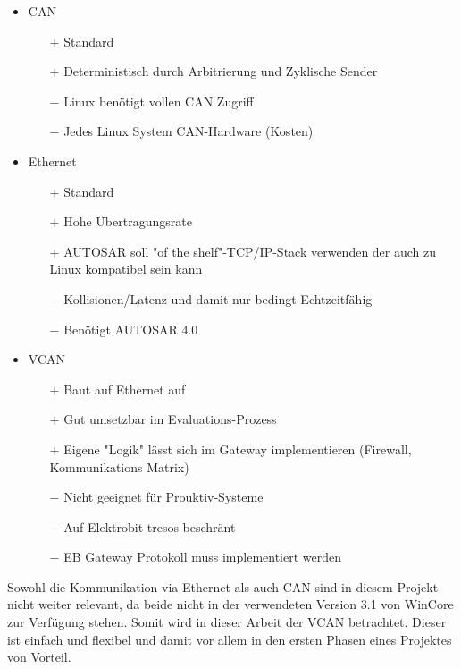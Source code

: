 \documentclass[
  a4paper,					    %
  twoside,
  DIV=calc,     				%
  bibliography=totoc,
  cleardoublepage=empty,
  ngerman,     					%
  final       					%
]{scrbook}
\begin{document}
\begin{itemize}
    \item CAN
    \begin{itemize}
        \item[$+$] Standard
        \item[$+$] Deterministisch durch Arbitrierung und Zyklische Sender
        \item[$-$] Linux benötigt vollen CAN Zugriff
        \item[$-$] Jedes Linux System CAN-Hardware (Kosten)
    \end{itemize}
    \item Ethernet
    \begin{itemize}
        \item[$+$] Standard
        \item[$+$] Hohe Übertragungsrate
        \item[$+$] AUTOSAR soll "of the shelf"-TCP/IP-Stack verwenden der auch zu Linux kompatibel sein kann\cite[S. 21]{autosar_eth}
        \item[$-$] Kollisionen/Latenz und damit nur bedingt Echtzeitfähig
        \item[$-$] Benötigt AUTOSAR 4.0
    \end{itemize}
    \item VCAN
    \begin{itemize}
        \item[$+$] Baut auf Ethernet auf
        \item[$+$] Gut umsetzbar im Evaluations-Prozess
        \item[$+$] Eigene "Logik" lässt sich im Gateway implementieren (Firewall, Kommunikations Matrix)
        \item[$-$] Nicht geeignet für Prouktiv-Systeme
        \item[$-$] Auf Elektrobit tresos beschränt
        \item[$-$] EB Gateway Protokoll muss implementiert werden
    \end{itemize}
\end{itemize}

Sowohl die Kommunikation via Ethernet als auch CAN sind in diesem Projekt nicht weiter relevant, da beide nicht in der verwendeten Version 3.1 von WinCore zur Verfügung stehen. Somit wird in dieser Arbeit der VCAN betrachtet. Dieser ist einfach und flexibel und damit vor allem in den ersten Phasen eines Projektes von Vorteil.
\end{document}
